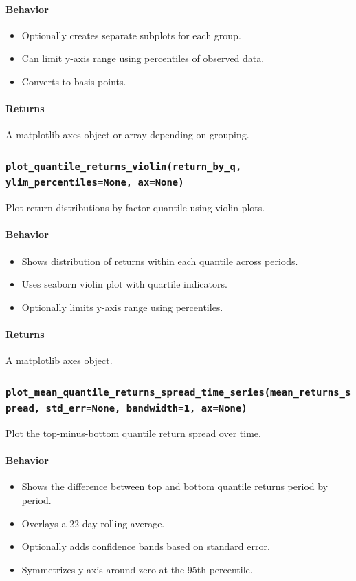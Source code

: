 \documentclass[11pt]{article}
\begin{document}
\paragraph{Behavior}
\begin{itemize}
  \item Optionally creates separate subplots for each group.
  \item Can limit y-axis range using percentiles of observed data.
  \item Converts to basis points.
\end{itemize}

\paragraph{Returns}
A matplotlib axes object or array depending on grouping.

\subsubsection{\texttt{plot\_quantile\_returns\_violin(return\_by\_q, ylim\_percentiles=None, ax=None)}}
Plot return distributions by factor quantile using violin plots.

\paragraph{Behavior}
\begin{itemize}
  \item Shows distribution of returns within each quantile across periods.
  \item Uses seaborn violin plot with quartile indicators.
  \item Optionally limits y-axis range using percentiles.
\end{itemize}

\paragraph{Returns}
A matplotlib axes object.

\subsubsection{\texttt{plot\_mean\_quantile\_returns\_spread\_time\_series(mean\_returns\_spread, std\_err=None, bandwidth=1, ax=None)}}
Plot the top-minus-bottom quantile return spread over time.

\paragraph{Behavior}
\begin{itemize}
  \item Shows the difference between top and bottom quantile returns period by period.
  \item Overlays a 22-day rolling average.
  \item Optionally adds confidence bands based on standard error.
  \item Symmetrizes y-axis around zero at the 95th percentile.
\end{itemize}
\end{document}
